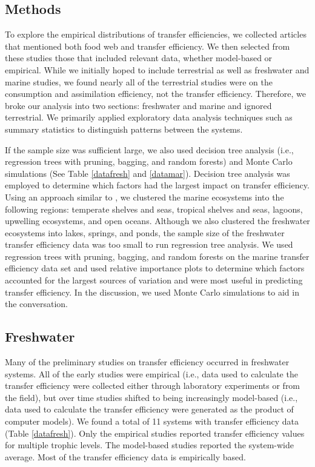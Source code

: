 \documentclass[oneside,12pt,final]{sty/ucthesis-CA2012}
\let\cite\citep                             %
\begin{document}
\begin{mainmatter}
\section{Methods}
To explore the empirical distributions of transfer efficiencies, we collected  articles that mentioned both food web and transfer efficiency. We then selected from these studies those that included relevant data, whether model-based or empirical. While we initially hoped to include terrestrial as well as freshwater and marine studies, we found nearly all of the terrestrial studies were on the consumption and assimilation efficiency, not the transfer efficiency. Therefore, we broke our analysis into two sections: freshwater and marine and ignored terrestrial. We primarily applied exploratory data analysis techniques such as summary statistics to distinguish patterns between the systems. 

\vspace{5mm}

If the sample size was sufficient large, we also used decision tree analysis (i.e., regression trees with pruning, bagging, and random forests) and Monte Carlo simulations (See Table \ref{datafresh} and \ref{datamar}). Decision tree analysis was employed to determine which factors had the largest impact on transfer efficiency. Using an approach similar to \cite{libralato2008novel}, we clustered the marine ecosystems into the following regions: temperate shelves and seas, tropical shelves and seas, lagoons, upwelling ecosystems, and open oceans. Although we also clustered the freshwater ecosystems into lakes, springs, and ponds, the sample size of the freshwater transfer efficiency data was too small to run regression tree analysis. We used regression trees with pruning, bagging, and random forests on the marine transfer efficiency data set and used relative importance plots to determine which factors accounted for the largest sources of variation and were most useful in predicting transfer efficiency. In the discussion, we used Monte Carlo simulations to aid in the conversation.

\subsection{Freshwater}
Many of the preliminary studies on transfer efficiency occurred in freshwater systems. All of the early studies were empirical (i.e., data used to calculate the transfer efficiency were collected either through laboratory experiments or from the field), but over time studies shifted to being increasingly model-based (i.e., data used to calculate the transfer efficiency were generated as the product of computer models). We found a total of 11 systems with transfer efficiency data (Table \ref{datafresh}). Only the empirical studies reported transfer efficiency values for multiple trophic levels. The model-based studies reported the system-wide average. Most of the transfer efficiency data is empirically based. 


\end{mainmatter}
\end{document}
